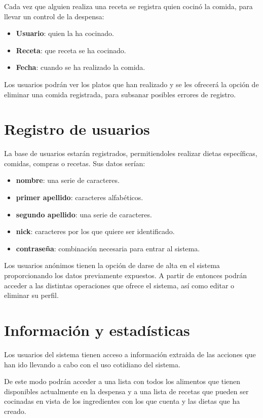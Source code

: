 \documentclass[a4paper,12pt]{report}
\begin{document}
Cada vez que alguien realiza una receta se registra quien cocinó la
comida, para llevar un control de la despensa:
\begin{itemize}
\item \textbf{Usuario}: quien la ha cocinado.
\item \textbf{Receta}: que receta se ha cocinado.
\item \textbf{Fecha}: cuando se ha realizado la comida.
\end{itemize}

\vspace{0.2cm}
Los usuarios podrán ver los platos que han realizado y se les
ofrecerá la opción de eliminar una comida registrada, para subsanar
posibles errores de registro.

\section{Registro de usuarios}
\label{sec-1-3}
La base de usuarios estarán registrados, permitiendoles realizar
dietas específicas, comidas, compras o recetas. Sus datos serían:
\begin{itemize}
\item \textbf{nombre}: una serie de caracteres.
\item \textbf{primer apellido}: caracteres alfabéticos.
\item \textbf{segundo apellido}:  una serie de caracteres.
\item \textbf{nick}: caracteres por los que quiere ser identificado.
\item \textbf{contraseña}: combinación necesaria para entrar al sistema.
\end{itemize}

\vspace{0.2cm}
Los usuarios anónimos tienen la opción de darse de alta en el
sistema proporcionando los datos previamente expuestos. A partir de
entonces podrán acceder a las distintas operaciones que ofrece el
sistema, así como editar o eliminar su perfil.


\section{Información y estadísticas}
\label{sec-1-4}
Los usuarios del sistema tienen acceso a información extraida de
las acciones que han ido llevando a cabo con el uso cotidiano del
sistema.

De este modo podrán acceder a una lista con todos los alimentos que
tienen disponibles actualmente en la despensa y a una lista de
recetas que pueden ser cocinadas en vista de los ingredientes con
los que cuenta y las dietas que ha creado.
\end{document}
